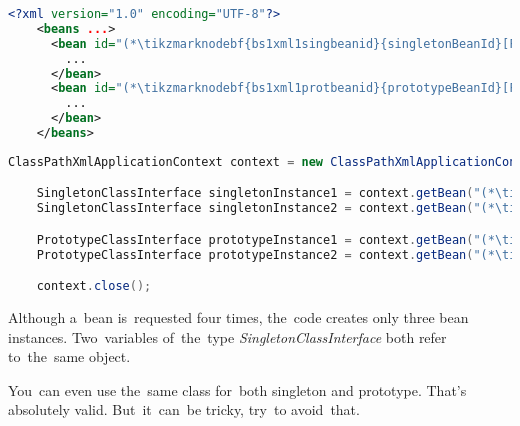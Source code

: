 \example
\begin{lstlisting}[language=XML, title={Configuration XML}]
    <?xml version="1.0" encoding="UTF-8"?>
    <beans ...>
      <bean id="(*\tikzmarknodebf{bs1xml1singbeanid}{singletonBeanId}[ForestGreen]*)" class="package.subfolder.SingletonClass">
        ...
      </bean>
      <bean id="(*\tikzmarknodebf{bs1xml1protbeanid}{prototypeBeanId}[ForestGreen]*)" class="package.subfolder.PrototypeClass" scope="prototype">
        ...
      </bean>
    </beans>
\end{lstlisting}
\begin{lstlisting}[language=Java, title={Usage}]
    ClassPathXmlApplicationContext context = new ClassPathXmlApplicationContext("configurationFile.xml");

    SingletonClassInterface singletonInstance1 = context.getBean("(*\tikzmarknodebf{bs1java1singbeanid1}{singletonBeanId}[ForestGreen]*)", SingletonClassInterface.class);
    SingletonClassInterface singletonInstance2 = context.getBean("(*\tikzmarknodebf{bs1java1singbeanid2}{singletonBeanId}[ForestGreen]*)", SingletonClassInterface.class);

    PrototypeClassInterface prototypeInstance1 = context.getBean("(*\tikzmarknodebf{bs1java1protbeanid1}{prototypeBeanId}[ForestGreen]*)", PrototypeClassInterface.class);
    PrototypeClassInterface prototypeInstance2 = context.getBean("(*\tikzmarknodebf{bs1java1protbeanid2}{prototypeBeanId}[ForestGreen]*)", PrototypeClassInterface.class);

    context.close();
\end{lstlisting}

\noindent Although a~bean is~requested four times, the~code creates only three bean instances. Two~variables of~the~type \textit{SingletonClassInterface} both refer to~the~same object.
\newpage

\note You~can even use the~same class for~both singleton and prototype. That's absolutely valid. But~it~can~be tricky, try~to avoid~that.

